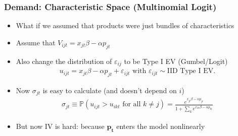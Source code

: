 \begin{frame}
\frametitle{Demand: Characteristic Space (Multinomial Logit)}

\begin{itemize}
    \item What if we assumed that products were just bundles of characteristics
    \item Assume that $V_{ijt} = x_{jt} \beta - \alpha p_{jt}$
    \item Also change the distribution of $\varepsilon_{ij}$ to be Type I EV (Gumbel/Logit)
    \begin{align*}
        u_{ijt} = x_{jt} \beta- \alpha p_{jt} +  \varepsilon_{ijt} \text{ with } \varepsilon_{ijt} \sim \text{IID Type I EV}.
    \end{align*}
    \item Now $\sigma_{jt}$ is easy to calculate (and doesn't depend on $i$)
     \begin{align*}
          \sigma_{jt} \equiv \mathbb{P}(u_{ijt} > u_{ikt} \text{ for all } k \neq j)  = 
    \frac{e^{x_{jt} \beta- \alpha p_{jt}}}{1+\sum_k e^{x_{kt} \beta- \alpha p_{kt} }}
    \end{align*}
    \item But now IV is hard: because $\mathbf{p_t}$ enters the model \alert{nonlinearly}
\end{itemize}
\end{frame}





